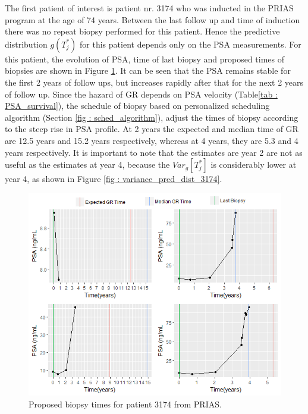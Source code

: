 The first patient of interest is patient nr. 3174 who was inducted in the PRIAS program at the age of 74 years. Between the last follow up and time of induction there was no repeat biopsy performed for this patient. Hence the predictive distribution $g(T^*_j)$  for this patient depends only on the PSA measurements. For this patient, the evolution of PSA, time of last biopsy and proposed times of biopsies are shown in Figure \ref{fig : prias_demo_pid_3174}. It can be seen that the PSA remains stable for the first 2 years of follow ups, but increases rapidly after that for the next 2 years of follow up. Since the hazard of GR depends on PSA velocity (Table\ref{tab : PSA_survival}), the schedule of biopsy based on personalized scheduling algorithm (Section \ref{fig : sched_algorithm}), adjust the times of biopsy according to the steep rise in PSA profile. At 2 years the expected and median time of GR are 12.5 years and 15.2 years respectively, whereas at 4 years, they are 5.3 and 4 years respectively. It is important to note that the estimates are year 2 are not as useful as the estimates at year 4, because the $Var_g[T^*_j]$ is considerably lower at year 4, as shown in Figure \ref{fig : variance_pred_dist_3174}.\\

\begin{figure}[!htb]
\centering
\captionsetup{justification=centering}
\includegraphics[width=\textwidth]{images/prias_demo/case_3174.png}
\caption{\label{fig : prias_demo_pid_3174} Proposed biopsy times for patient 3174 from PRIAS.}
\end{figure}

